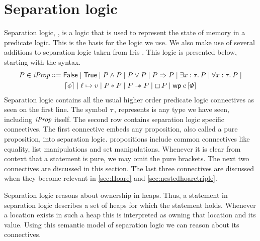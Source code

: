 \documentclass[thesis.tex]{subfiles}
\begin{document}
\section{Separation logic}
\label{sec:seplogic}
Separation logic, \cite*{ishtiaqBIAssertionLanguage2001,reynoldsSeparationLogicLogic2002}, is a logic that is used to represent the state of memory in a predicate logic. This is the basis for the logic we use. We also make use of several additions to separation logic taken from Iris \cite*{krebbersEssenceHigherOrderConcurrent2017}. This logic is presented below, starting with the syntax.
\begin{align*}
  \prop \in \iProp \bnfdef{} & \FALSE \mid \TRUE \mid \prop \land \prop \mid \prop \lor \prop \mid \prop \Ra \prop \mid \Exists \var:\type. \prop \mid \All \var:\type. \prop \mid \\
                             & \pure{\pprop} \mid \loc \fmapsto \val \mid \prop * \prop \mid \prop \wand \prop \mid \always\prop \mid \wpre\expr{\pred}
\end{align*}
Separation logic contains all the usual higher order predicate logic connectives as seen on the first line. The symbol $\tau$, represents is any type we have seen, including $\textit{iProp}$ itself. The second row contains separation logic specific connectives. The first connective embeds any \coq proposition, also called a pure proposition, into separation logic. \coq propositions include common connectives like equality, list manipulations and set manipulations. Whenever it is clear from context that a statement is pure, we may omit the pure brackets. The next two connectives are discussed in this section. The last three connectives are discussed when they become relevant in \cref*{sec:Hoare} and \cref*{sec:nestedhoaretriple}.

Separation logic reasons about ownership in heaps. Thus, a statement in separation logic describes a set of heaps for which the statement holds. Whenever a location exists in such a heap this is interpreted as owning that location and its value. Using this semantic model of separation logic we can reason about its connectives.
\end{document}
